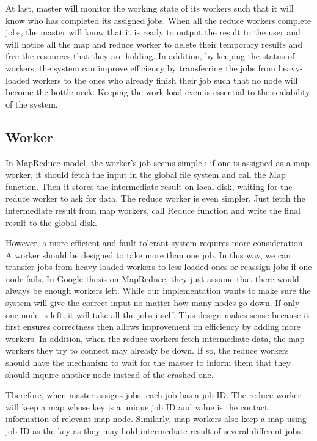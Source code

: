\documentclass[12pt]{article}
\begin{document}
At last, master will monitor the working state of its workers such that it will know who has completed its assigned jobs. When all 
the reduce workers complete jobs, the master will know that it is ready to output the result to the user and will notice all the map and
reduce worker to delete their temporary results and free the resources that they are holding. In addition, by keeping the status of workers,
the system can improve efficiency by transferring the jobs from heavy-loaded workers to the ones who already finish their job such that no
node will become the bottle-neck. Keeping the work load even is essential to the scalability of the system.   
\subsection{Worker}

In MapReduce model, the worker's job seems simple : if one is assigned as a map worker, it should fetch the input in the global file system and
call the Map function. Then it stores the intermediate result on local disk, waiting for the reduce worker to ask for data. The reduce worker
is even simpler. Just fetch the intermediate result from map workers, call Reduce function and write the final result to the global disk. 

However, a more efficient and fault-tolerant system requires more consideration. A worker should be designed to take more than one job. In this
way, we can transfer jobs from heavy-loaded workers to less loaded ones or reassign jobs if one node fails. In Google thesis on MapReduce, they just assume that there would always be enough workers left. While our implementation wants to make sure the system will give the correct input no matter how many nodes go down. If only one node is left, it will take all the jobs itself. This design makes sense because it first ensures correctness then allows improvement on efficiency by adding more workers.
In addition, when the reduce workers fetch intermediate data, the map workers they try to connect may already be down. If so, the reduce workers
should have the mechanism to wait for the master to inform them that they should inquire another node instead of the crashed one.

Therefore, when master assigns jobs, each job has a job ID. The reduce worker will keep a map whose key is a unique job ID and value is the contact information of relevant map node. Similarly, map workers also keep a map using job ID as the key as they may hold intermediate result of several different jobs.
    
\end{document}
